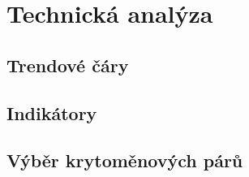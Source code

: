 \chapter{Technická analýza}
\label{chap:TechnicalAnalysis}

\section{Trendové čáry}
\label{sec:TrendingLines}

\section{Indikátory}
\label{sec:Indicators}

\section{Výběr krytoměnových párů}
\label{sec:ChoosingCryptopairs}

\endinput